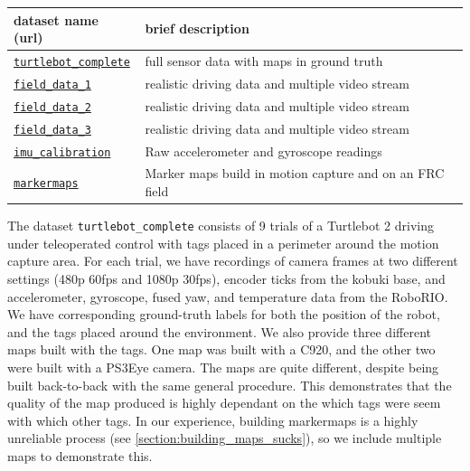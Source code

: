 \documentclass{article}
\begin{document}
  \begin{table}[H]
    \centering
    \begin{tabular}{|l|l|} \hline
      dataset name (url) & brief description \\ \hline
      \href{https://users.wpi.edu/~pdmitrano/phil-datasets/turtlebot_mocap_complete.tar.gz}{\texttt{turtlebot\_complete}} & full sensor data with maps in ground truth\\ \hline
      \href{https://users.wpi.edu/~pdmitrano/phil-datasets/field_data_1.tar.gz}{\texttt{field\_data\_1}} & realistic driving data and multiple video stream \\ \hline
      \href{https://users.wpi.edu/~pdmitrano/phil-datasets/field_data_2.tar.gz}{\texttt{field\_data\_2}} & realistic driving data and multiple video stream \\ \hline
      \href{https://users.wpi.edu/~pdmitrano/phil-datasets/field_data_3.tar.gz}{\texttt{field\_data\_3}} & realistic driving data and multiple video stream \\ \hline
      \href{https://users.wpi.edu/~pdmitrano/phil-datasets/imu_calibration.tar.gz}{\texttt{imu\_calibration}} & Raw accelerometer and gyroscope readings \\ \hline
      \href{https://users.wpi.edu/~pdmitrano/phil-datasets/markermaps.tar.gz}{\texttt{markermaps}} & Marker maps build in motion capture and on an FRC field \\ \hline
    \end{tabular}
    \label{table:datasets}
  \end{table}

  The dataset \texttt{turtlebot\_complete} consists of 9 trials of a Turtlebot 2 driving under teleoperated control with tags placed in a perimeter around the motion capture area. For each trial, we have recordings of camera frames at two different settings (480p 60fps and 1080p 30fps), encoder ticks from the kobuki base, and accelerometer, gyroscope, fused yaw, and temperature data from the RoboRIO. We have corresponding ground-truth labels for both the position of the robot, and the tags placed around the environment. We also provide three different maps built with the tags. One map was built with a C920, and the other two were built with a PS3Eye camera. The maps are quite different, despite being built back-to-back with the same general procedure. This demonstrates that the quality of the map produced is highly dependant on the which tags were seem with which other tags. In our experience, building markermaps is a highly unreliable process (see \ref{section:building_maps_sucks}), so we include multiple maps to demonstrate this.
\end{document}
